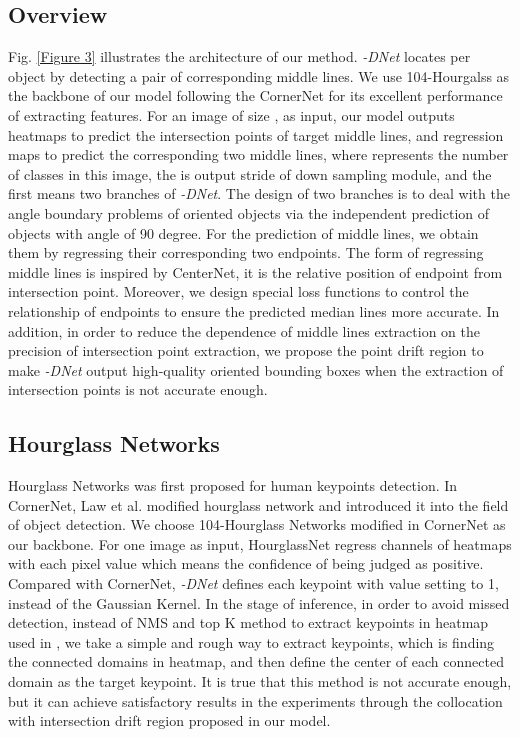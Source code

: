 \documentclass[runningheads]{llncs}
\begin{document}
\subsection{Overview}
Fig. \ref{Figure 3} illustrates the architecture of our method. \textit{-DNet} locates per object by detecting a pair of  corresponding middle lines. We use 104-Hourgalss\cite{law2018cornernet} as the backbone of our model following the CornerNet \cite{law2018cornernet} for its excellent performance of extracting features. For an image of size , as input, our model outputs  heatmaps to predict the intersection points of target middle lines, and  regression maps to predict the corresponding two middle lines, where  represents the number of classes in this image, the  is output stride of down sampling module, and the first  means two branches of \textit{-DNet}. The design of two branches is to deal with the angle boundary problems of oriented objects via the independent prediction of objects with angle of 90 degree. For the prediction of middle lines, we obtain them by regressing their corresponding two endpoints. The form of regressing middle lines is inspired by CenterNet\cite{zhou2019objects}, it is the relative position of endpoint from intersection point. Moreover, we design special loss functions to control the relationship of endpoints to ensure the predicted median lines more accurate. In addition, in order to reduce the dependence of middle lines extraction on the precision of intersection point extraction, we propose the point drift region to make \textit{-DNet} output high-quality oriented bounding boxes when the extraction of intersection points is not accurate enough. 



\subsection{Hourglass Networks}\label{section:3.2}
Hourglass Networks\cite{newell2016stacked} was first proposed for human keypoints detection. In CornerNet\cite{law2018cornernet}, Law et al. modified hourglass network and introduced it into the field of object detection. We choose 104-Hourglass Networks modified in CornerNet\cite{law2018cornernet} as our backbone. For one image as input, HourglassNet regress  channels of heatmaps with each pixel value  which means the confidence of being judged as positive. Compared with CornerNet, \textit{-DNet} defines each keypoint with value setting to 1, instead of the Gaussian Kernel. In the stage of inference, in order to avoid missed detection, instead of NMS and top K method to extract keypoints in heatmap used in \cite{law2018cornernet,zhou2019bottom,tian2019fcos,zhou2019objects}, we take a simple and rough way to extract keypoints, which is finding the connected domains in heatmap, and then define the center of each connected domain as the target keypoint. It is true that this method is not accurate enough, but it can achieve satisfactory results in the experiments through the collocation with intersection drift region proposed in our model.
\end{document}

